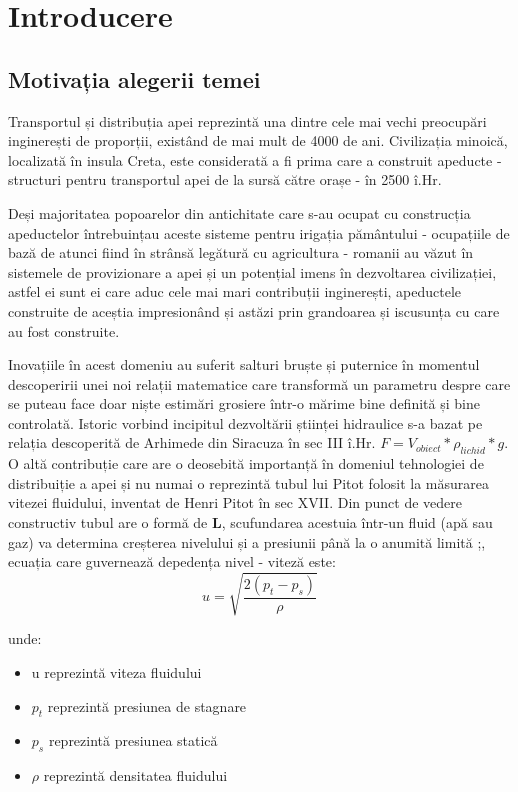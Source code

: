 \chapter{Introducere}
\label{chap:intro}

\section{Motivația alegerii temei}
Transportul și distribuția apei reprezintă una dintre cele mai vechi preocupări inginerești de proporții, existând de mai mult de 4000 de ani. Civilizația minoică, localizată în insula Creta, este considerată a fi prima care a construit apeducte - structuri pentru transportul apei de la sursă către orașe - în 2500 î.Hr. 

Deși majoritatea popoarelor din antichitate care s-au ocupat cu construcția apeductelor întrebuințau aceste sisteme pentru irigația pământului - ocupațiile de bază de atunci fiind în strânsă legătură cu agricultura - romanii au văzut în sistemele de provizionare a apei și un potențial imens în dezvoltarea civilizației, astfel ei sunt ei care aduc cele mai mari contribuții inginerești, apeductele construite de aceștia impresionând și astăzi prin grandoarea și iscusunța cu care au fost construite.

Inovațiile în acest domeniu au suferit salturi bruște și puternice în momentul descoperirii unei noi relații matematice care transformă un parametru despre care se puteau face doar niște estimări grosiere într-o mărime bine definită și bine controlată. Istoric vorbind incipitul dezvoltării științei hidraulice s-a bazat pe relația descoperită de Arhimede din Siracuza în sec III î.Hr. $F = V_{obiect}*\rho_{lichid}*g$. O altă contribuție care are o deosebită importanță în domeniul tehnologiei de distribuiție a apei și nu numai o reprezintă tubul lui Pitot folosit la măsurarea vitezei fluidului, inventat de Henri Pitot în sec XVII. Din punct de vedere constructiv tubul are o formă de \textbf{L}, scufundarea acestuia într-un fluid (apă sau gaz) va determina creșterea nivelului și a presiunii până la o anumită limită ;\cite{klopfenstein1998air}, ecuația care guvernează depedența nivel - viteză este:
\begin{equation}
u = \sqrt{\frac{2(p_t-p_s)}{\rho}} 
\end{equation}

unde:

\begin{itemize}
\item u reprezintă viteza fluidului
\item $p_t$ reprezintă presiunea de stagnare
\item $p_s$ reprezintă presiunea statică
\item $\rho$ reprezintă densitatea fluidului
\end{itemize}

